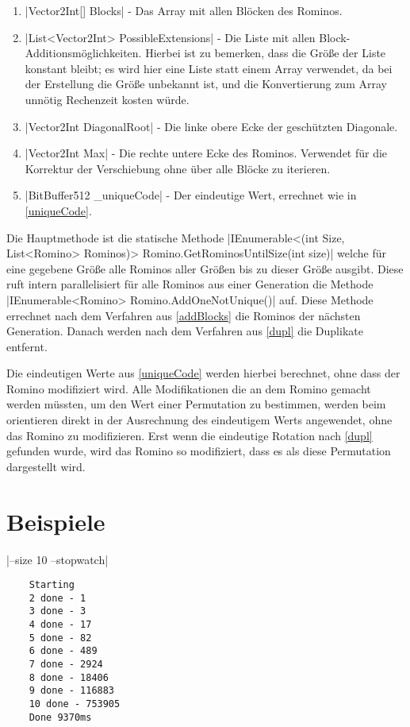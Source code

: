 \documentclass[a4paper,10pt,ngerman]{scrartcl}
\begin{document}
\begin{enumerate}
    \item |Vector2Int[] Blocks| - 
        Das Array mit allen Blöcken des Rominos.
    \item |List<Vector2Int> PossibleExtensions| - 
        Die Liste mit allen Block-Additionsmöglichkeiten.
        Hierbei ist zu bemerken, dass die Größe der Liste konstant bleibt; es wird hier eine Liste statt einem Array verwendet, da bei der Erstellung die Größe unbekannt ist, und die Konvertierung zum Array unnötig Rechenzeit kosten würde.
    \item |Vector2Int DiagonalRoot| - Die linke obere Ecke der 
        geschützten Diagonale.
    \item |Vector2Int Max| - Die rechte untere Ecke des Rominos.
        Verwendet für die Korrektur der Verschiebung ohne über alle Blöcke zu
        iterieren.
    \item |BitBuffer512 \_uniqueCode| - Der eindeutige Wert, errechnet
        wie in \cref{uniqueCode}.
\end{enumerate}

Die Hauptmethode ist die statische Methode
|IEnumerable<(int Size, List<Romino> Rominos)> Romino.GetRominosUntilSize(int size)|
welche für eine gegebene Größe alle Rominos aller Größen bis zu dieser
Größe ausgibt. Diese ruft intern parallelisiert für alle Rominos aus einer
Generation die Methode |IEnumerable<Romino> Romino.AddOneNotUnique()|
auf.
Diese Methode errechnet nach dem Verfahren aus \cref{addBlocks} die
Rominos der nächsten Generation.
Danach werden nach dem Verfahren aus \cref{dupl} die Duplikate entfernt.

Die eindeutigen Werte aus \cref{uniqueCode} werden hierbei berechnet, ohne
dass der Romino modifiziert wird. Alle Modifikationen die an dem Romino
gemacht werden müssten, um den Wert einer Permutation zu bestimmen, werden
beim orientieren direkt in der Ausrechnung des eindeutigem Werts angewendet, ohne das Romino zu
modifizieren. Erst wenn die eindeutige Rotation nach \cref{dupl} gefunden
wurde, wird das Romino so modifiziert, dass es als diese Permutation
dargestellt wird.

\section{Beispiele}

|--size 10 --stopwatch|

\begin{lstlisting}
    Starting
    2 done - 1
    3 done - 3
    4 done - 17
    5 done - 82
    6 done - 489
    7 done - 2924
    8 done - 18406
    9 done - 116883
    10 done - 753905
    Done 9370ms
\end{lstlisting}
\end{document}
